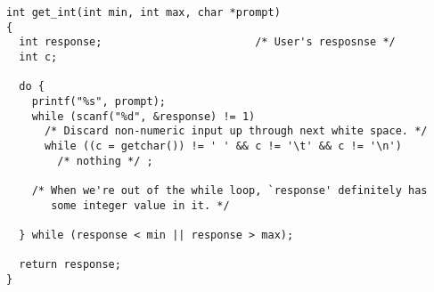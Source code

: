 \begin{verbatim}
int get_int(int min, int max, char *prompt)
{
  int response;                        /* User's resposnse */
  int c;

  do {
    printf("%s", prompt);
    while (scanf("%d", &response) != 1)
      /* Discard non-numeric input up through next white space. */
      while ((c = getchar()) != ' ' && c != '\t' && c != '\n')
        /* nothing */ ;

    /* When we're out of the while loop, `response' definitely has 
       some integer value in it. */

  } while (response < min || response > max);

  return response;
}
\end{verbatim}

